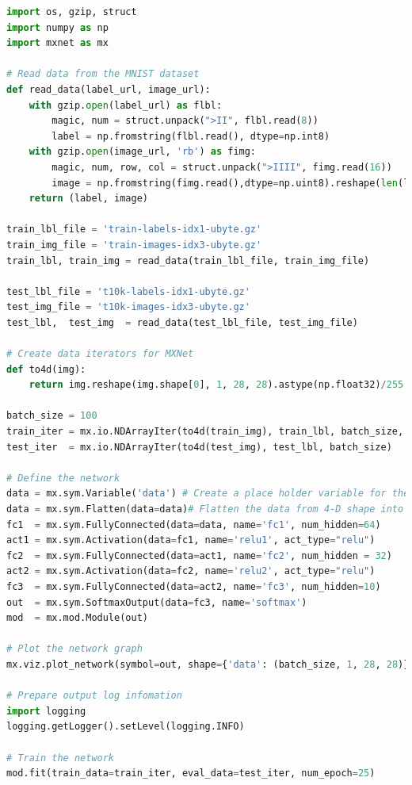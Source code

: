 \documentclass[11pt, oneside]{article}   	%
\begin{document}
\begin{lstlisting}[language=python]
import os, gzip, struct
import numpy as np
import mxnet as mx

# Read data from the MNIST dataset
def read_data(label_url, image_url):
    with gzip.open(label_url) as flbl:
        magic, num = struct.unpack(">II", flbl.read(8))
        label = np.fromstring(flbl.read(), dtype=np.int8)
    with gzip.open(image_url, 'rb') as fimg:
        magic, num, row, col = struct.unpack(">IIII", fimg.read(16))
        image = np.fromstring(fimg.read(),dtype=np.uint8).reshape(len(label),row,col)
    return (label, image)

train_lbl_file = 'train-labels-idx1-ubyte.gz'
train_img_file = 'train-images-idx3-ubyte.gz'
train_lbl, train_img = read_data(train_lbl_file, train_img_file)

test_lbl_file = 't10k-labels-idx1-ubyte.gz'
test_img_file = 't10k-images-idx3-ubyte.gz'
test_lbl,  test_img  = read_data(test_lbl_file, test_img_file)

# Create data iterators for MXNet
def to4d(img):
    return img.reshape(img.shape[0], 1, 28, 28).astype(np.float32)/255

batch_size = 100
train_iter = mx.io.NDArrayIter(to4d(train_img), train_lbl, batch_size, shuffle=True)
test_iter  = mx.io.NDArrayIter(to4d(test_img), test_lbl, batch_size)

# Define the network
data = mx.sym.Variable('data') # Create a place holder variable for the input data
data = mx.sym.Flatten(data=data)# Flatten the data from 4-D shape into 2-D
fc1  = mx.sym.FullyConnected(data=data, name='fc1', num_hidden=64) 
act1 = mx.sym.Activation(data=fc1, name='relu1', act_type="relu")
fc2  = mx.sym.FullyConnected(data=act1, name='fc2', num_hidden = 32)
act2 = mx.sym.Activation(data=fc2, name='relu2', act_type="relu")
fc3  = mx.sym.FullyConnected(data=act2, name='fc3', num_hidden=10)
out  = mx.sym.SoftmaxOutput(data=fc3, name='softmax')
mod  = mx.mod.Module(out)

# Plot the network graph
mx.viz.plot_network(symbol=out, shape={'data': (batch_size, 1, 28, 28)}).view()

# Prepare output log infomation
import logging
logging.getLogger().setLevel(logging.INFO)

# Train the network
mod.fit(train_data=train_iter, eval_data=test_iter, num_epoch=25)
\end{lstlisting}
\end{document}
